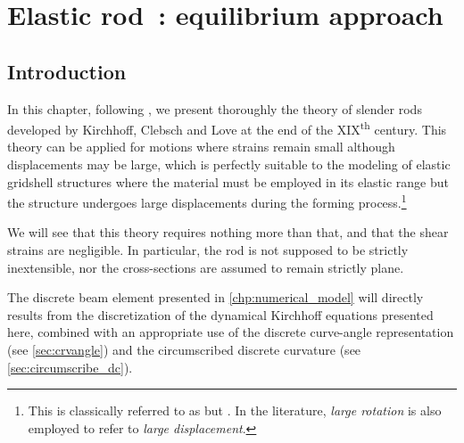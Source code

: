 
\chapter{Elastic rod~: equilibrium approach}
\label{chp:kirchhoff}

\section{Introduction}

In this chapter, following , we present thoroughly the theory of slender rods developed by Kirchhoff, Clebsch and Love at the end of the XIX\textsuperscript{th} century. This theory can be applied for motions where strains remain small although displacements may be large, which is perfectly suitable to the modeling of elastic gridshell structures where the material must be employed in its elastic range but the structure undergoes large displacements during the forming process.\footnote{This is classically referred to as  but . In the literature, \emph{large rotation} is also employed to refer to \emph{large displacement}.}

We will see that this theory requires nothing more than that, and that the shear strains are negligible. In particular, the rod is not supposed to be strictly inextensible, nor the cross-sections are assumed to remain strictly plane.

The discrete beam element presented in \cref{chp:numerical_model} will directly results from the discretization of the dynamical Kirchhoff equations presented here, combined with an appropriate use of the discrete curve-angle representation (see \cref{sec:crvangle}) and the circumscribed discrete curvature (see \cref{sec:circumscribe_dc}).

